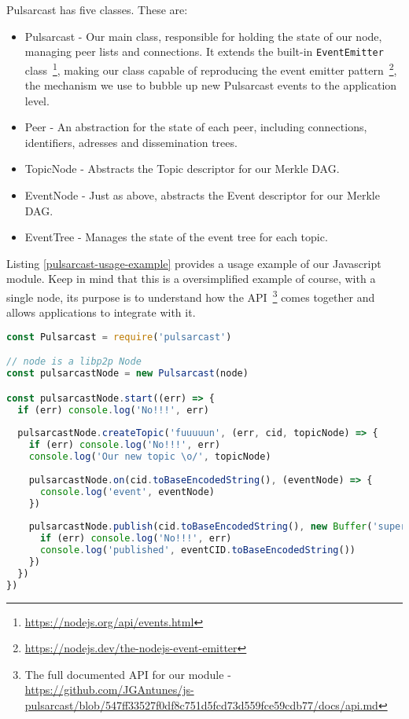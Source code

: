 Pulsarcast has five classes. These are:

\begin{itemize}
  \item
    Pulsarcast - Our main class, responsible for holding the state of our node, managing peer lists and connections. It extends the built-in \verb|EventEmitter| class~\footnote{\url{https://nodejs.org/api/events.html}}, making our class capable of reproducing the event emitter pattern~\footnote{\url{https://nodejs.dev/the-nodejs-event-emitter}}, the mechanism we use to bubble up new Pulsarcast events to the application level.
  \item
		Peer - An abstraction for the state of each peer, including connections, identifiers, adresses and dissemination trees.
  \item
    TopicNode - Abstracts the Topic descriptor for our Merkle DAG.
  \item
    EventNode - Just as above, abstracts the Event descriptor for our Merkle DAG.
  \item
    EventTree - Manages the state of the event tree for each topic.
\end{itemize}

Listing \ref{pulsarcast-usage-example} provides a usage example of our
Javascript module. Keep in mind that this is a oversimplified example of
course, with a single node, its purpose is to understand how the
API~\footnote{The full documented API for our module - \url{https://github.com/JGAntunes/js-pulsarcast/blob/547ff33527f0df8c751d5fcd73d559fce59cdb77/docs/api.md}}
comes together and allows applications to integrate with it.

\begin{lstlisting}[language=JavaScript, float=h, caption={Usage example of our Pulsarcast module},label={pulsarcast-usage-example}]
const Pulsarcast = require('pulsarcast')

// node is a libp2p Node
const pulsarcastNode = new Pulsarcast(node)

const pulsarcastNode.start((err) => {
  if (err) console.log('No!!!', err)
  
  pulsarcastNode.createTopic('fuuuuun', (err, cid, topicNode) => {
    if (err) console.log('No!!!', err)
    console.log('Our new topic \o/', topicNode)
    
    pulsarcastNode.on(cid.toBaseEncodedString(), (eventNode) => {
      console.log('event', eventNode)
    })
    
    pulsarcastNode.publish(cid.toBaseEncodedString(), new Buffer('super fun!'), (err, eventCID) => {
      if (err) console.log('No!!!', err)
      console.log('published', eventCID.toBaseEncodedString())
    })
  })
})
\end{lstlisting}

